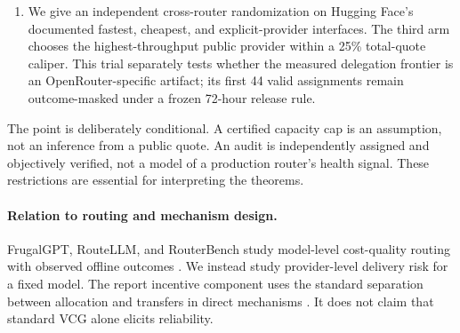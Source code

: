 \documentclass[11pt]{article}
\theoremstyle{definition}
\begin{document}
\begin{enumerate}
  hypothesis. Within 1,227 same-model snapshots, the endpoint that becomes
  rate-limited next is not an older, relatively cheaper quote; quote age is
  null and adding stale-quote state does not improve temporal prediction.
  Smaller displayed capacity and higher utilization are more informative,
  favoring a thin-capacity or queueing interpretation over a stale-liquidity
  interpretation in this discovery panel. An exact request-to-public-state
  bridge then documents zero capacity-complete matches. We preserve that
  failed capacity trial and launch a separately preregistered, outcome-masked
  randomized enforcement-stress policy trial.
  \item We give an independent cross-router randomization on Hugging Face's
  documented fastest, cheapest, and explicit-provider interfaces. The third
  arm chooses the highest-throughput public provider within a 25\% total-quote
  caliper. This trial separately tests whether the measured delegation frontier
  is an OpenRouter-specific artifact; its first 44 valid assignments remain
  outcome-masked under a frozen 72-hour release rule.
\end{enumerate}

The point is deliberately conditional. A certified capacity cap is an
assumption, not an inference from a public quote. An audit is independently
assigned and objectively verified, not a model of a production router's health
signal. These restrictions are essential for interpreting the theorems.

\paragraph{Relation to routing and mechanism design.}
FrugalGPT, RouteLLM, and RouterBench study model-level cost-quality routing
with observed offline outcomes \cite{chen2023frugalgpt,ong2024routellm,hu2024routerbench}.
We instead study provider-level delivery risk for a fixed model. The report
incentive component uses the standard separation between allocation and
transfers in direct mechanisms
\cite{vickrey1961,clarke1971,groves1973,myerson1981}. It does not claim that
standard VCG alone elicits reliability.
\end{document}
